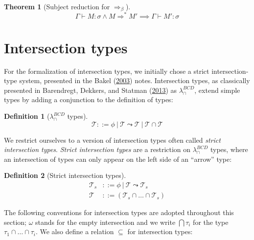 \documentclass[a4paper, 12pt, twoside]{style/ociamthesis}
\theoremstyle{plain}
\newtheorem{Theorem}{Theorem}[chapter]
\theoremstyle{definition}
\newtheorem{Definition}{Definition}[chapter]
\theoremstyle{remark}
\begin{document}
\begin{Theorem}[Subject reduction for $\Rightarrow_\beta$]

\[\Gamma \vdash M : \sigma \land M \Rightarrow^* M' \implies \Gamma \vdash M' : \sigma\]

\end{Theorem}

\newpage

\section{Intersection types}\label{intersection-types}

For the formalization of intersection types, we initially chose a strict
intersection-type system, presented in the Bakel
(\protect\hyperlink{ref-bakel}{2003}) notes. Intersection types, as
classically presented in Barendregt, Dekkers, and Statman
(\protect\hyperlink{ref-barendregt13}{2013}) as \(\lambda_\cap^{BCD}\),
extend simple types by adding a conjunction to the definition of types:

\begin{Definition}[$\lambda_\cap^{BCD}$ types]

\[\mathcal{T} ::= \phi\ |\ \mathcal{T} \leadsto \mathcal{T}\ |\ \mathcal{T} \cap \mathcal{T}\]

\end{Definition}

We restrict ourselves to a version of intersection types often called
\emph{strict intersection types}. \emph{Strict intersection types} are a
restriction on \(\lambda_\cap^{BCD}\) types, where an intersection of
types can only appear on the left side of an ``arrow'' type:

\begin{Definition}[Strict intersection types]

\begin{align*} 
\mathcal{T}_s &::= \phi\ |\ \mathcal{T} \leadsto \mathcal{T}_s \\ 
\mathcal{T} &::= (\mathcal{T}_s \cap\hdots\cap \mathcal{T}_s)
\end{align*}

\end{Definition}

The following conventions for intersection types are adopted throughout
this section; \(\omega\) stands for the empty intersection and we write
\(\bigcap\tau_i\) for the type \(\tau_1 \cap\hdots\cap \tau_i\). We also
define a relation \(\subseteq\) for intersection types:
\end{document}
